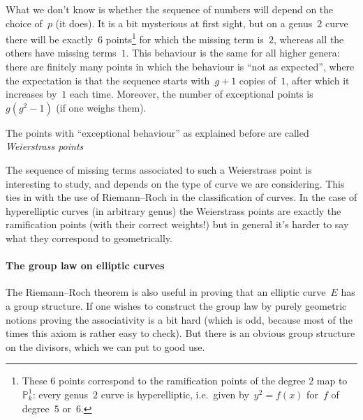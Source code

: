 \documentclass[10pt,a4paper]{article}
\begin{document}
What we don't know is whether the sequence of numbers will depend on the choice of~$p$ (it does). It is a bit mysterious at first sight, but on a genus~$2$ curve there will be exactly~$6$ points\footnote{These 6 points correspond to the ramification points of the degree 2 map to~$\mathbb{P}_k^1$: every genus~$2$ curve is hyperelliptic, i.e.\ given by~$y^2=f(x)$ for~$f$ of degree~$5$ or~$6$.} for which the missing term is~$2$, whereas all the others have missing terms~$1$. This behaviour is the same for all higher genera: there are finitely many points in which the behaviour is ``not as expected'', where the expectation is that the sequence starts with~$g+1$ copies of~$1$, after which it increases by~$1$ each time. Moreover, the number of exceptional points is~$g(g^2-1)$ (if one weighs them).

\begin{definition}
  The points with ``exceptional behaviour'' as explained before are called \emph{Weierstrass points}
\end{definition}

The sequence of missing terms associated to such a Weierstrass point is interesting to study, and depends on the type of curve we are considering. This ties in with the use of Riemann--Roch in the classification of curves. In the case of hyperelliptic curves (in arbitrary genus) the Weierstrass points are exactly the ramification points (with their correct weights!) but in general it's harder to say what they correspond to geometrically.

\paragraph{The group law on elliptic curves}
The Riemann--Roch theorem is also useful in proving that an elliptic curve~$E$ has a group structure. If one wishes to construct the group law by purely geometric notions proving the associativity is a bit hard (which is odd, because most of the times this axiom is rather easy to check). But there is an obvious group structure on the divisors, which we can put to good use.
\end{document}
